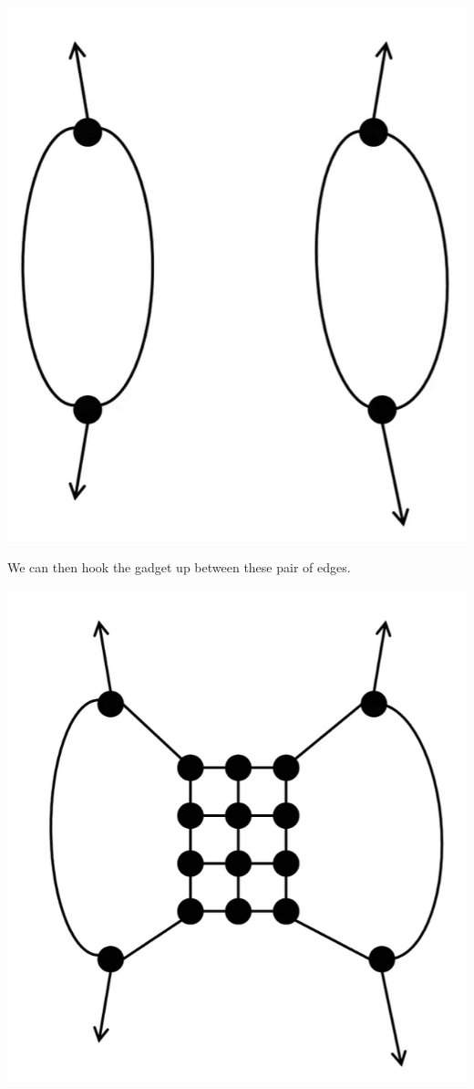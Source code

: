 \documentclass[letterpaper]{article}
\begin{document}
\begin{itemize}
\begin{center}
        \includegraphics[scale=0.35]{assets/zoe_ham_7.png}
    \end{center}
    We can then hook the gadget up between these pair of edges. 
    \begin{center}
        \includegraphics[scale=0.35]{assets/zoe_ham_8.png}

\end{center}
\end{itemize}
\end{document}
